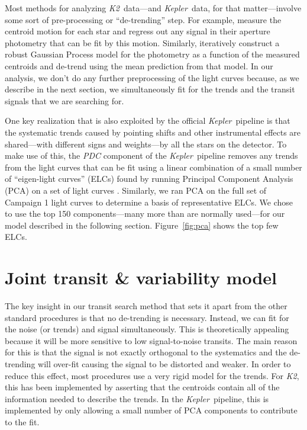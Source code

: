 \documentclass[12pt,preprint]{aastex}
\newcommand{\project}[1]{\textsl{#1}} %
\newcommand{\kepler}{\project{Kepler}}
\newcommand{\KT}{\project{K2}}
\newcommand{\figref}[1]{\ref{fig:#1}}
\newcommand{\Fig}[1]{Figure~\figref{#1}}
\begin{document}
Most methods for analyzing \KT\ data---and \kepler\ data, for that
matter---involve some sort of pre-processing or ``de-trending'' step.
For example, \citet{Vanderburg:2014} measure the centroid motion for each star
and regress out any signal in their aperture photometry that can be fit by
this motion.
Similarly, \citet{Crossfield:2015} iteratively construct a robust Gaussian
Process model for the photometry as a function of the measured centroids and
de-trend using the mean prediction from that model.
In our analysis, we don't do any further preprocessing of the light curves
because, as we describe in the next section, we simultaneously fit for the
trends and the transit signals that we are searching for.

One key realization that is also exploited by the official \kepler\ pipeline
is that the systematic trends caused by pointing shifts and other instrumental
effects are shared---with different signs and weights---by all the stars on
the detector.
To make use of this, the \project{PDC} component of the \kepler\ pipeline
removes any trends from the light curves that can be fit using a linear
combination of a small number of ``eigen-light curves'' (ELCs) found by
running Principal Component Analysis (PCA) on a set of light curves
\citep{pdc1, pdc2}.
Similarly, we ran PCA on the full set of Campaign 1 light curves to determine
a basis of representative ELCs.
We chose to use the top 150 components---many more than are normally
used---for our model described in the following section.
\Fig{pca} shows the top few ELCs.


\section{Joint transit \& variability model}
\label{sec:model}

The key insight in our transit search method that sets it apart from the
other standard procedures is that no de-trending is necessary.
Instead, we can fit for the noise (or trends) and signal simultaneously.
This is theoretically appealing because it will be more sensitive to low
signal-to-noise transits.
The main reason for this is that the signal is not exactly orthogonal to the
systematics and the de-trending will over-fit causing the signal to be
distorted and weaker.
In order to reduce this effect, most procedures use a very rigid model for
the trends.
For \KT, this has been implemented by asserting that the centroids contain
all of the information needed to describe the trends.
In the \kepler\ pipeline, this is implemented by only allowing a small number
of PCA components to contribute to the fit.
\end{document}
